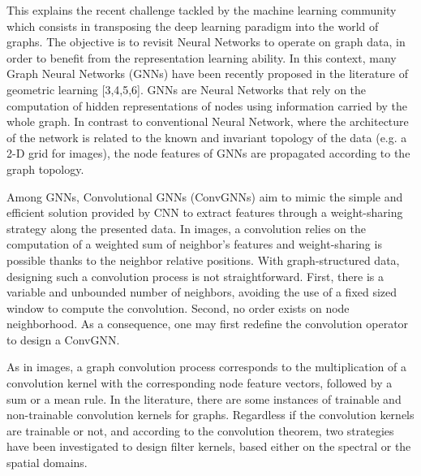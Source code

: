 \documentclass{article}
\begin{document}
This explains the recent challenge tackled by the machine learning community which consists in transposing the deep learning paradigm into the world of graphs. The objective is to revisit Neural Networks to operate on graph data, in order to benefit from the representation learning ability. In this context, many Graph Neural Networks (GNNs) have been recently proposed in the literature of geometric learning  [3,4,5,6]. GNNs are Neural Networks that rely on the computation of hidden representations of nodes using information carried by the whole graph. In contrast to conventional Neural Network, where the architecture of the network is related to the known and invariant topology of the data (e.g. a 2-D grid for images), the node features of GNNs are propagated according to the graph topology.

Among GNNs, Convolutional GNNs (ConvGNNs) aim to mimic the simple and efficient solution provided by CNN to extract features through a weight-sharing strategy along the presented data. In images, a convolution relies on the computation of a weighted sum of neighbor’s features and weight-sharing is possible thanks to the neighbor relative positions. With graph-structured data, designing such a convolution process is not straightforward. First, there is a variable and unbounded number of neighbors, avoiding the use of a fixed sized window to compute the convolution. Second, no order exists on node neighborhood. As a consequence, one may first redefine the convolution operator to design a ConvGNN. 


As in images, a graph convolution process corresponds to the multiplication of a convolution kernel with the corresponding node feature vectors, followed by a sum or a mean rule. In the literature, there are some instances of trainable and non-trainable convolution kernels for graphs. Regardless if the convolution kernels are trainable or not, and according to the convolution theorem, two strategies have been investigated to design filter kernels, based either on the spectral or the spatial domains. 
\end{document}

